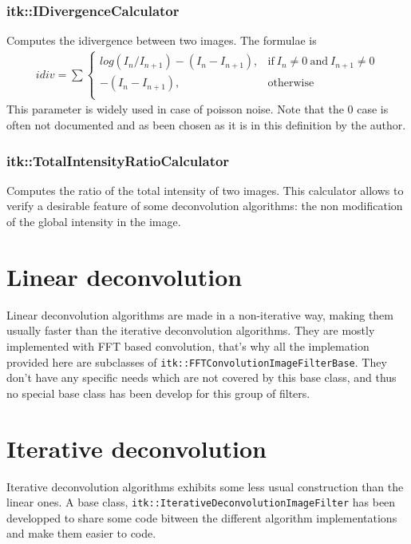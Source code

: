 \documentclass{InsightArticle}
\begin{document}
\subsubsection{itk::IDivergenceCalculator}

Computes the idivergence between two images.
The formulae is 
\begin{eqnarray}
\label{eq:imageFormation}
idiv = \sum 
\begin{cases} 
  log( I_n/I_{n+1} ) - ( I_n - I_{n+1} ),  & \text{if}~ I_n \ne 0 ~\text{and}~ I_{n+1} \ne 0 \\
  - ( I_n - I_{n+1} ),  & \text{otherwise} \\
\end{cases}
\end{eqnarray}
This parameter is widely used in case of poisson noise. Note that the 0 case is often not documented
and as been chosen as it is in this definition by the author.

\subsubsection{itk::TotalIntensityRatioCalculator}

Computes the ratio of the total intensity of two images. This calculator allows to verify a desirable feature of some deconvolution
algorithms: the non modification of the global intensity in the image.

\section{Linear deconvolution}

Linear deconvolution algorithms are made in a non-iterative way, making them usually faster than the iterative deconvolution algorithms.
They are mostly implemented with FFT based convolution, that's why all the implemation provided here are subclasses of
\verb$itk::FFTConvolutionImageFilterBase$. They don't have any specific needs which are not covered by this base class,
and thus no special base class has been develop for this group of filters.

\section{Iterative deconvolution}

Iterative deconvolution algorithms exhibits some less usual construction than the linear ones. A base class, \verb$itk::IterativeDeconvolutionImageFilter$
has been developped to share some code bitween the different algorithm implementations and make them easier to code.
\end{document}
